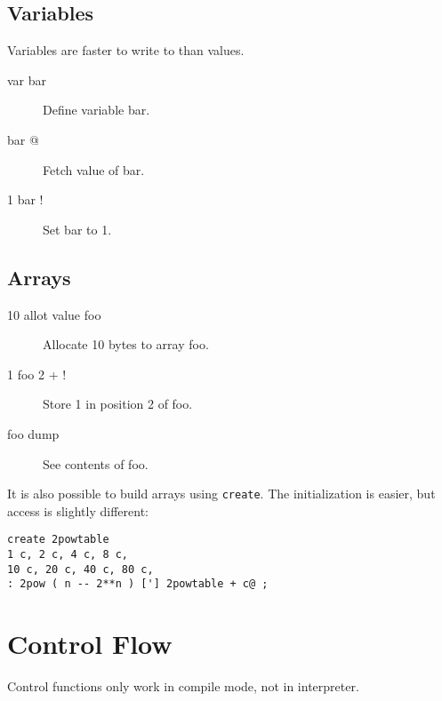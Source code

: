 \subsection{Variables}

Variables are faster to write to than values.

\begin{description}
\item[var bar] Define variable bar.
\item[bar @] Fetch value of bar.
\item[1 bar !] Set bar to 1.
\end{description}

\subsection{Arrays}

\begin{description}
\item[10 allot value foo] Allocate 10 bytes to array foo.
\item[1 foo 2 + !] Store 1 in position 2 of foo.
\item[foo dump] See contents of foo.
\end{description}

It is also possible to build arrays using \texttt{create}. The initialization is easier, but access is slightly different:

\begin{verbatim}
create 2powtable
1 c, 2 c, 4 c, 8 c,
10 c, 20 c, 40 c, 80 c,
: 2pow ( n -- 2**n ) ['] 2powtable + c@ ;
\end{verbatim}

\section{Control Flow}

Control functions only work in compile mode, not in interpreter.

